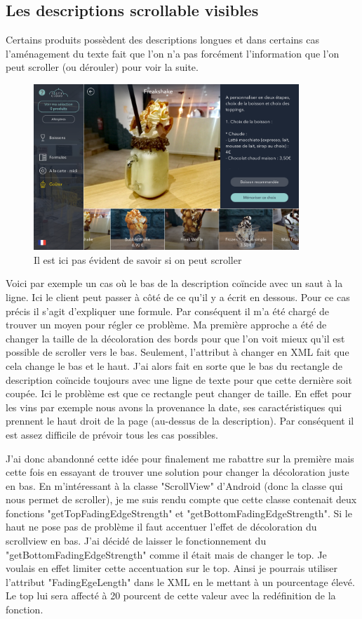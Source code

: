 \subsection{Les descriptions scrollable visibles}

Certains produits possèdent des descriptions longues et dans certains cas l'aménagement du texte fait que l'on n'a pas forcément l'information que l'on peut scroller (ou dérouler) pour voir la suite.

\begin{figure}[!htb]
  \centering
  \includegraphics[width=100mm,scale=0.5]{images/scroll.png}
  \caption{Il est ici pas évident de savoir si on peut scroller}
  \label{fig:boat1}
\end{figure}

Voici par exemple un cas où le bas de la description coïncide avec un saut à la ligne. Ici le client peut passer à côté de ce qu'il y a écrit en dessous. Pour ce cas précis il s'agit d'expliquer une formule. Par conséquent il m'a été chargé de trouver un moyen pour régler ce problème. Ma première approche a été de changer la taille de la décoloration des bords pour que l'on voit mieux qu'il est possible de scroller vers le bas. Seulement, l'attribut à changer en XML fait que cela change le bas et le haut. J'ai alors fait en sorte que le bas du rectangle de description coïncide toujours avec une ligne de texte pour que cette dernière soit coupée. Ici le problème est que ce rectangle peut changer de taille. En effet pour les vins par exemple nous avons la provenance la date, ses caractéristiques qui prennent le haut droit de la page (au-dessus de la description). Par conséquent il est assez difficile de prévoir tous les cas possibles. 

J'ai donc abandonné cette idée pour finalement me rabattre sur la première mais cette fois en essayant de trouver une solution pour changer la décoloration juste en bas. En m'intéressant à la classe "ScrollView" d'Android (donc la classe qui nous permet de scroller), je me suis rendu compte que cette classe contenait deux fonctions "getTopFadingEdgeStrength" et "getBottomFadingEdgeStrength". Si le haut ne pose pas de problème il faut accentuer l'effet de décoloration du scrollview en bas. J'ai décidé de laisser le fonctionnement du "getBottomFadingEdgeStrength" comme il était mais de changer le top. Je voulais en effet limiter cette accentuation sur le top. Ainsi je pourrais utiliser l'attribut "FadingEgeLength" dans le XML en le mettant à un pourcentage élevé. Le top lui sera affecté à 20 pourcent de cette valeur avec la redéfinition de la fonction.

